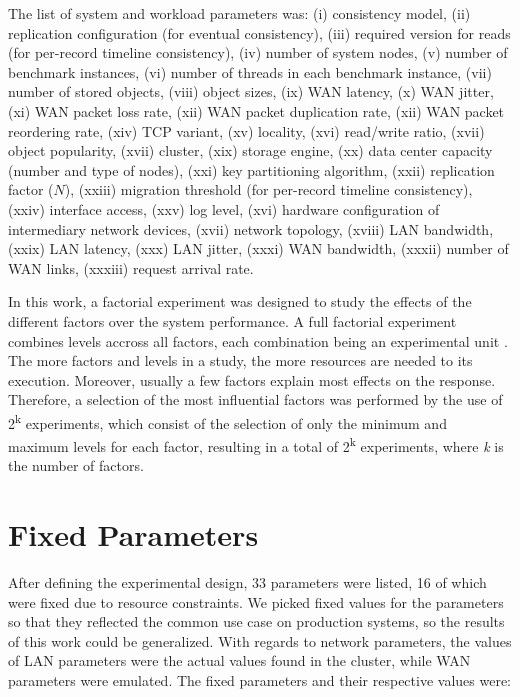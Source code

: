 \documentclass[man,floatsintext,12pt]{apa6}
\begin{document}
The list of system and workload parameters was: (i) consistency model, (ii)
replication configuration (for eventual consistency), (iii) required version
for reads (for per-record timeline consistency), (iv) number of system nodes,
(v) number of benchmark instances, (vi) number of threads in each benchmark
instance, (vii) number of stored objects, (viii) object sizes, (ix) WAN
latency, (x) WAN jitter, (xi) WAN packet loss rate, (xii) WAN packet
duplication rate, (xii) WAN packet reordering rate, (xiv) TCP variant, (xv)
locality, (xvi) read/write ratio, (xvii) object popularity, (xvii) cluster,
(xix) storage engine, (xx) data center capacity (number and type of nodes),
(xxi) key partitioning algorithm, (xxii) replication factor ($ N $), (xxiii)
migration threshold (for per-record timeline consistency), (xxiv) interface
access, (xxv) log level, (xvi) hardware configuration of intermediary network
devices, (xvii) network topology, (xviii) LAN bandwidth, (xxix) LAN latency,
(xxx) LAN jitter, (xxxi) WAN bandwidth, (xxxii) number of WAN links, (xxxiii)
request arrival rate.

In this work, a factorial experiment was designed to study the effects of the
different factors over the system performance. A full factorial experiment
combines levels accross all factors, each combination being an experimental
unit \parencite{Jain1991}. The more factors and levels in a study, the more
resources are needed to its execution. Moreover, usually a few factors explain
most effects on the response. Therefore, a selection of the most influential
factors was performed by the use of 2\textsuperscript{k} experiments, which
consist of the selection of only the minimum and maximum levels for each
factor, resulting in a total of 2\textsuperscript{k} experiments, where
\textit{k} is the number of factors.

\section{Fixed Parameters}

After defining the experimental design, 33 parameters were listed, 16 of which
were fixed due to resource constraints. We picked fixed values for the
parameters so that they reflected the common use case on production systems, so
the results of this work could be generalized. With regards to network
parameters, the values of LAN parameters were the actual values found in the
cluster, while WAN parameters were emulated. The fixed parameters and their
respective values were:
\end{document}
